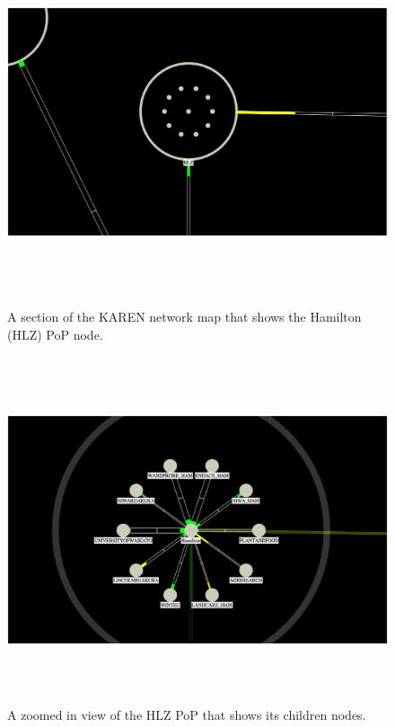 \documentclass[11pt, a4paper]{report}
\begin{document}
 
\begin{figure}
\centering
\includegraphics[width=170mm,height=107.58mm]{assets/nodes1-0.eps}
\caption{A section of the KAREN network map that shows the Hamilton (HLZ) PoP
node.}
\label{fig:nodes1.0}
\end{figure}

\begin{figure}
\centering
\includegraphics[width=170mm,height=101.93mm]{assets/nodes1-1.eps}
\caption{A zoomed in view of the HLZ PoP that shows its children nodes.}
\label{fig:nodes1.1}
\end{figure}
\end{document}
